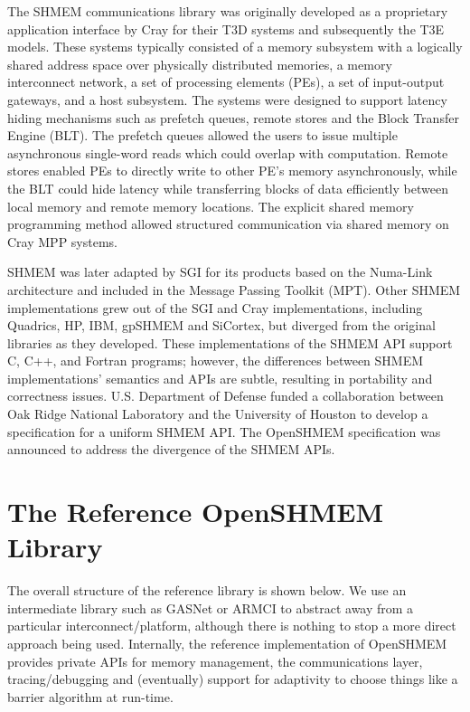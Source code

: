 \documentclass[english]{article}
\newcommand{\openshmem} {\mbox{OpenSHMEM}\xspace}
\begin{document}
The SHMEM communications library was originally developed as a
proprietary application interface by Cray for their T3D systems and
subsequently the T3E models. These systems typically consisted of a
memory subsystem with a logically shared address space over physically
distributed memories, a memory interconnect network, a set of
processing elements (PEs), a set of input-output gateways, and a host
subsystem. The systems were designed to support latency hiding
mechanisms such as prefetch queues, remote stores and the Block
Transfer Engine (BLT). The prefetch queues allowed the users to issue
multiple asynchronous single-word reads which could overlap with
computation. Remote stores enabled PEs to directly write to other PE's
memory asynchronously, while the BLT could hide latency while
transferring blocks of data efficiently between local memory and
remote memory locations. The explicit shared memory programming method
allowed structured communication via shared memory on Cray MPP
systems.

SHMEM was later adapted by SGI for its products based on the Numa-Link
architecture and included in the Message Passing Toolkit (MPT). Other
SHMEM implementations grew out of the SGI and Cray implementations,
including Quadrics, HP, IBM, gpSHMEM and SiCortex, but diverged from
the original libraries as they developed. These implementations of the
SHMEM API support C, C++, and Fortran programs; however, the
differences between SHMEM implementations' semantics and APIs are
subtle, resulting in portability and correctness
issues. U.S. Department of Defense funded a collaboration between Oak
Ridge National Laboratory and the University of Houston to develop a
specification for a uniform SHMEM API. The \openshmem specification was
announced to address the divergence of the SHMEM APIs.

\section{The Reference \openshmem Library}

The overall structure of the reference library is shown below. We use
an intermediate library such as GASNet or ARMCI to abstract away from
a particular interconnect/platform, although there is nothing to stop
a more direct approach being used. Internally, the reference
implementation of \openshmem provides private APIs for memory
management, the communications layer, tracing/debugging and
(eventually) support for adaptivity to choose things like a barrier
algorithm at run-time.
\end{document}
